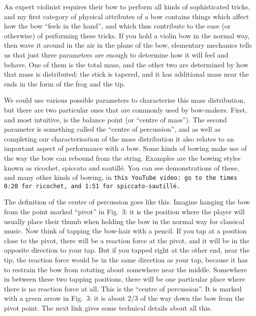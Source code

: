   An expert violinist requires their bow to perform all kinds of sophisticated 
  tricks, and my first category of physical attributes of a bow contains things 
  which affect how the bow “feels in the hand”, and which thus contribute to 
  the ease (or otherwise) of performing these tricks. If you hold a violin bow 
  in the normal way, then wave it around in the air in the plane of the bow, 
  elementary mechanics tells us that just three parameters are enough to 
  determine how it will feel and behave. One of them is the total mass, and the 
  other two are determined by how that mass is distributed: the stick is 
  tapered, and it has additional mass near the ends in the form of the frog and 
  the tip. 

  We could use various possible parameters to characterise this mass 
  distribution, but there are two particular ones that are commonly used by 
  bow-makers. First, and most intuitive, is the balance point (or “centre of 
  mass”). The second parameter is something called the “centre of percussion”, 
  and as well as completing our characterisation of the mass distribution it 
  also relates to an important aspect of performance with a bow. Some kinds of 
  bowing make use of the way the bow can rebound from the string. Examples are 
  the bowing styles known as ricochet, spiccato and sautillé. You can see 
  demonstrations of these, and many other kinds of bowing, in \tt{}this YouTube 
  video\rm{}: go to the times 0:20 for ricochet, and 1:51 for 
  spiccato-sautillé. 

  The definition of the centre of percussion goes like this. Imagine hanging 
  the bow from the point marked “pivot” in Fig.\ 3: it is the position where 
  the player will usually place their thumb when holding the bow in the normal 
  way for classical music. Now think of tapping the bow-hair with a pencil. If 
  you tap at a position close to the pivot, there will be a reaction force at 
  the pivot, and it will be in the opposite direction to your tap. But if you 
  tapped right at the other end, near the tip, the reaction force would be in 
  the same direction as your tap, because it has to restrain the bow from 
  rotating about somewhere near the middle. Somewhere in between these two 
  tapping positions, there will be one particular place where there is no 
  reaction force at all. This is the “centre of percussion”. It is marked with 
  a green arrow in Fig.\ 3: it is about 2/3 of the way down the bow from the 
  pivot point. The next link gives some technical details about all this. 


